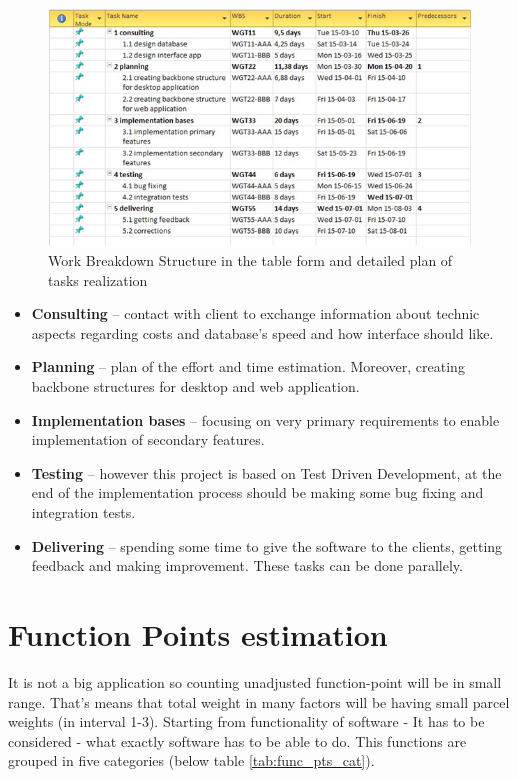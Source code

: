 \documentclass[a4paper,11pt,onecolumn,oneside]{book}
\begin{document}
\begin{figure}[H]
\centering
\includegraphics[width=1\textwidth]{img/WBS.png}
\caption{Work Breakdown Structure in the table form and detailed plan of tasks realization}
\label{fig:WBS}
\end{figure} 

\begin{itemize}
  \item \textbf{Consulting} – contact with client to exchange information about technic aspects regarding costs and database’s speed and how interface should like.

  \item \textbf{Planning} – plan of the effort and time estimation. Moreover, creating backbone structures for desktop and web application. 

  \item \textbf{Implementation bases} – focusing on very primary requirements to enable implementation of secondary features. 

  \item \textbf{Testing} – however this project is based on Test Driven Development, at the end of the implementation process should be making some bug fixing and integration tests.

  \item \textbf{Delivering} – spending some time to give the software to the clients, getting feedback and making improvement. These tasks can be done parallely. 
\end{itemize}

\section{Function Points estimation}

It is not a big application so counting unadjusted function-point will be in small range. That's means that total weight in many factors will be having small parcel weights (in interval 1-3). Starting from functionality of software - It has to be considered - what exactly software has to be able to do. This functions are grouped in five categories (below table \ref{tab:func_pts_cat}).
\end{document}
